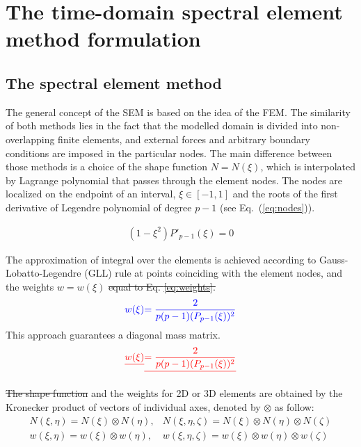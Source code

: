 \documentclass[materials,article,submit,moreauthors,pdftex]{Definitions/mdpi}
\providecommand{\DIFadd}[1]{{\protect\color{blue}{#1}}} %
\providecommand{\DIFdel}[1]{{\protect\color{red}\sout{#1}}}                      %
\providecommand{\DIFaddbegin}{} %
\providecommand{\DIFaddend}{} %
\providecommand{\DIFdelbegin}{} %
\providecommand{\DIFdelend}{} %
\begin{document}
\section{The time-domain spectral element method formulation}
\label{sec:time_SEM}
\subsection{The spectral element method}
\label{sec:sem}
The general concept of the SEM is based on the idea of the FEM.
The similarity of both methods lies in the fact that the modelled domain is divided into non-overlapping finite elements, and external forces and arbitrary boundary conditions are imposed in the particular nodes.
The main difference between those methods is a choice of the shape function \( N=N(\xi )\), which is interpolated by Lagrange polynomial that passes through the element nodes. The nodes are localized on the endpoint of an interval, \(\xi\in[-1,1]\) and the roots of the first derivative of Legendre polynomial of degree \(p-1\) (see Eq.~(\ref{eq:nodes})).

\begin{eqnarray}
(1-\xi^2)P'_{p-1}(\xi)=0
\label{eq:nodes}
\end{eqnarray}

The approximation of \DIFaddbegin \DIFadd{an }\DIFaddend integral over the elements is achieved according to Gauss-Lobatto-Legendre (GLL) rule at points coinciding with the element nodes, 
and the weights \(w=w(\xi)\) \DIFdelbegin \DIFdel{equal to Eq. \ref{eq:weights}. }\DIFdelend \DIFaddbegin \DIFadd{calculated as:
}\begin{eqnarray}
{\DIFadd{w(\xi)}} \DIFadd{= \frac{2}{p(p-1)(P_{p-1}(\xi))^2}
\label{eq:weights}
}\end{eqnarray}
\DIFaddend This approach guarantees a diagonal mass matrix.
\DIFdelbegin \begin{eqnarray*}
{\DIFdel{w(\xi)}} \DIFdel{= \frac{2}{p(p-1)(P_{p-1}(\xi))^2}
}\end{eqnarray*}%

\DIFdel{The shape function }\DIFdelend \DIFaddbegin \DIFadd{The shape functions }\DIFaddend and the weights for 2D or 3D elements are obtained by the Kronecker product of vectors of individual axes, denoted by \(\otimes\) as follow:
\begin{eqnarray}
N(\xi,\eta) = N(\xi)\otimes N(\eta), & N(\xi,\eta,\zeta) = N(\xi)\otimes N(\eta)\otimes N(\zeta) \nonumber\\
w(\xi,\eta) = w(\xi)\otimes w(\eta), & w(\xi,\eta,\zeta) = w(\xi)\otimes w(\eta)\otimes w(\zeta) 
\label{eq:3Dshape_weights}
\end{eqnarray}
\end{document}
